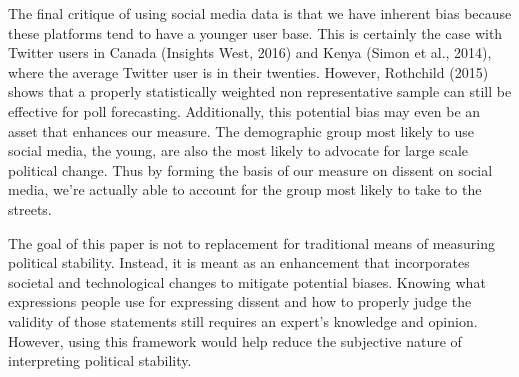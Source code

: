 \documentclass[12pt]{article}
\begin{document}
\begin{spacing}{1.5}
The final critique of using social media data is that we have inherent bias because these platforms tend to have a younger user base. This is certainly the case with Twitter users in Canada (Insights West, 2016) and Kenya (Simon et al., 2014), where the average Twitter user is in their twenties. However, Rothchild (2015) shows that a properly statistically weighted non representative sample can still be effective for poll forecasting. Additionally, this potential bias may even be an asset that enhances our measure. The demographic group most likely to use social media, the young, are also the most likely to advocate for large scale political change. Thus by forming the basis of our measure on dissent on social media, we're actually able to account for the group most likely to take to the streets.


The goal of this paper is not to replacement for traditional means of measuring political stability. Instead, it is meant as an enhancement that incorporates societal and technological changes to mitigate potential biases. Knowing what expressions people use for expressing dissent and how to properly judge the validity of those statements still requires an expert's knowledge and opinion. However, using this framework would help reduce the subjective nature of interpreting political stability. 


\end{spacing}

\pagebreak




\nocite{*}
\end{document}
